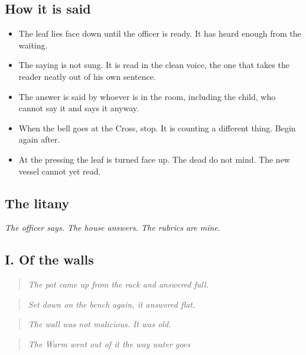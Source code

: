 \documentclass{design/chronicle}
\begin{document}
\subsection*{How it is said}

\begin{itemize}[leftmargin=1.4em,itemsep=1pt,topsep=3pt,parsep=0pt]

\item The leaf lies face down until the officer is ready. It has heard enough from the waiting.

\item The saying is not sung. It is read in the clean voice, the one that takes the reader neatly out of his own sentence.

\item The answer is said by whoever is in the room, including the child, who cannot say it and says it anyway.

\item When the bell goes at the Cross, stop. It is counting a different thing. Begin again after.

\item At the pressing the leaf is turned face up. The dead do not mind. The new vessel cannot yet read.

\end{itemize}

\subsection*{The litany}

\emph{The officer says. The house answers. The rubrics are mine.}

\subsection*{I. Of the walls}

\begin{quote}\itshape The pot came up from the rack and answered full.\end{quote}

\begin{quote}\itshape Set down on the bench again, it answered flat.\end{quote}

\begin{quote}\itshape The wall was not malicious. It was old.\end{quote}

\begin{quote}\itshape The Warm went out of it the way water goes\end{quote}
\end{document}
